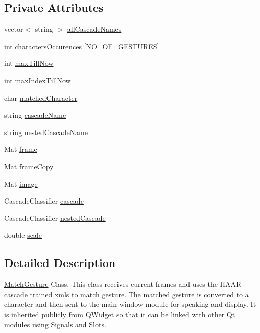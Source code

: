 \subsection*{Private Attributes}
\begin{DoxyCompactItemize}
\item 
vector$<$ string $>$ \hyperlink{classMatchGesture_a663e371a4051129393890b53e8d9f298}{allCascadeNames}
\item 
int \hyperlink{classMatchGesture_a57ceb174132391f082f42e58eac1866c}{charactersOccurences} \mbox{[}NO\_\-OF\_\-GESTURES\mbox{]}
\item 
int \hyperlink{classMatchGesture_a16665c0e1aa834c04a404141faf0a35b}{maxTillNow}
\item 
int \hyperlink{classMatchGesture_aefd5499b36ad81c08912b6566c5b42a0}{maxIndexTillNow}
\item 
char \hyperlink{classMatchGesture_a32a7db9f36bf5d23d764ef57bc467528}{matchedCharacter}
\item 
string \hyperlink{classMatchGesture_a6524899aea49fa93f259cb78ca0e0f3c}{cascadeName}
\item 
string \hyperlink{classMatchGesture_aacb8c478358eee5b075988893f267737}{nestedCascadeName}
\item 
Mat \hyperlink{classMatchGesture_acefa626782bb878de7a7394ff7dc80f6}{frame}
\item 
Mat \hyperlink{classMatchGesture_a8e1b515de34fb0746223b42d5497c817}{frameCopy}
\item 
Mat \hyperlink{classMatchGesture_abc309df906bffe0bc4050aefbf965d69}{image}
\item 
CascadeClassifier \hyperlink{classMatchGesture_a5f32a9342107ec1144c73c617c4d8e34}{cascade}
\item 
CascadeClassifier \hyperlink{classMatchGesture_aa938a749d3ef32508803cfd4fbf30c0a}{nestedCascade}
\item 
double \hyperlink{classMatchGesture_af3bb3af0d54664793eeaa80cf6249750}{scale}
\end{DoxyCompactItemize}


\subsection{Detailed Description}
\hyperlink{classMatchGesture}{MatchGesture} Class. This class receives current frames and uses the HAAR cascade trained xmls to match gesture. The matched gesture is converted to a character and then sent to the main window module for speaking and display. It is inherited publicly from QWidget so that it can be linked with other Qt modules using Signals and Slots. 

